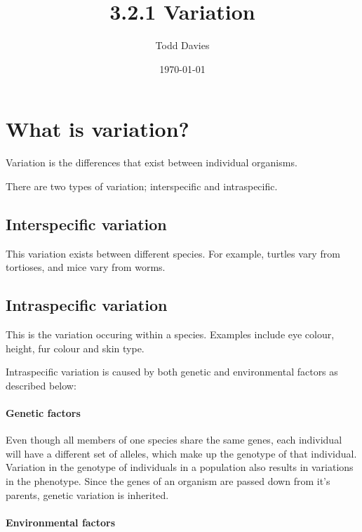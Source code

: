 \documentclass{article}
\author{Todd Davies}
\title{3.2.1 Variation}
\date{\today}
\begin{document}
\lhead{\today}

\maketitle

\section*{What is variation?}
\thispagestyle{empty}

Variation is the differences that exist between individual organisms.

There are two types of variation; interspecific and intraspecific.

\subsection*{Interspecific variation}

This variation exists between different species. For example, turtles vary from
tortioses, and mice vary from worms.


\subsection*{Intraspecific variation}

This is the variation occuring within a species. Examples include eye colour,
height, fur colour and skin type.

Intraspecific variation is caused by both genetic and environmental factors as
described below:

\paragraph*{Genetic factors}



Even though all members of one species share the same genes, each individual
will have a different set of alleles, which make up the genotype of that
individual. Variation in the genotype of individuals in a population also
results in variations in the phenotype. Since the genes of an organism are
passed down from it's parents, genetic variation is inherited.

\paragraph*{Environmental factors}
\end{document}
